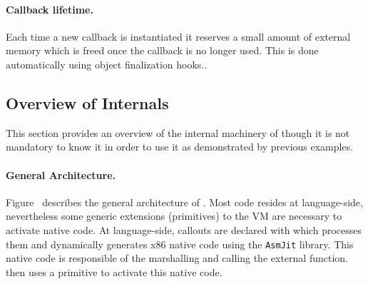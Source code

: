 



\paragraph{Callback lifetime.}
Each time a new callback is instantiated it reserves a small amount of external memory which is freed once the callback is no longer used.
This is done automatically using object finalization hooks..


\subsection{Overview of \NBFFI Internals}

This section provides an overview of the internal machinery of \NBFFI though it is not mandatory to know it in order to use it as demonstrated by previous examples.

\paragraph{General Architecture.}
Figure~ describes the general architecture of \NB.
Most code resides at language-side, nevertheless some generic extensions (primitives) to the VM are necessary to activate native code.
At language-side, callouts are declared with \NBFFI which processes them and dynamically generates x86 native code using the \texttt{AsmJit} library.
This native code is responsible of the marshalling and calling the external function.
\NB then uses a primitive to activate this native code.

